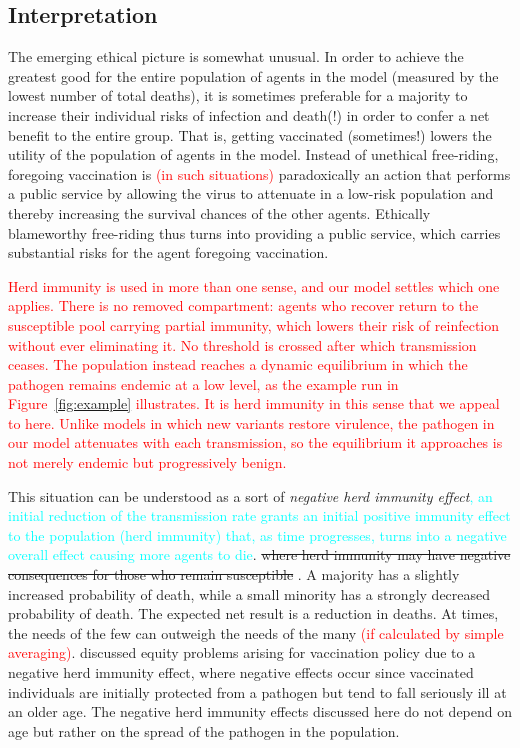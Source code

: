 \documentclass[a4paper,12pt]{article}
\newcommand{\juergen}[1]{\textcolor{cyan}{#1}}
\newcommand{\ignacio}[1]{\textcolor{red}{#1}}
\begin{document}
\subsection{Interpretation}
The emerging ethical picture is somewhat unusual. In order to achieve the greatest good for the entire population of agents in the model (measured by the lowest number of total deaths), it is sometimes preferable for a majority to increase their individual risks of infection and death(!) in order to confer a net benefit to the entire group. That is, getting vaccinated (sometimes!) lowers the utility of the population of agents in the model. Instead of unethical free-riding, foregoing vaccination is \ignacio{(in such situations)} paradoxically an action that performs a public service by allowing the virus to attenuate in a low-risk population and thereby increasing the survival chances of the other agents. Ethically blameworthy free-riding thus turns into providing a public service, which carries substantial risks for the agent foregoing vaccination.

\ignacio{Herd immunity is used in more than one sense, and our model settles which one applies. There is no removed compartment: agents who recover return to the susceptible pool carrying partial immunity, which lowers their risk of reinfection without ever eliminating it. No threshold is crossed after which transmission ceases. The population instead reaches a dynamic equilibrium in which the pathogen remains endemic at a low level, as the example run in Figure~\ref{fig:example} illustrates. It is herd immunity in this sense that we appeal to here. Unlike models in which new variants restore virulence, the pathogen in our model attenuates with each transmission, so the equilibrium it approaches is not merely endemic but progressively benign.}

This situation can be understood as a sort of \emph{negative herd immunity effect}\juergen{, an initial reduction of the transmission rate grants an initial positive immunity effect to the population (herd immunity) that, as time progresses, turns into a negative overall effect causing more agents to die}. \st{where herd immunity may have negative consequences for those who remain susceptible }\cite{Luyten2011}. A majority has a slightly increased probability of death, while a small minority has a strongly decreased probability of death. The expected net result is a reduction in deaths. At times, the needs of the few can outweigh the needs of the many \ignacio{(if calculated by simple averaging)}. \cite{Luyten2011} discussed equity problems arising for vaccination policy due to a negative herd immunity effect, where negative effects occur since vaccinated individuals are initially protected from a pathogen but tend to fall seriously ill at an older age. The negative herd immunity effects discussed here do not depend on age but rather on the spread of the pathogen in the population.
\end{document}

